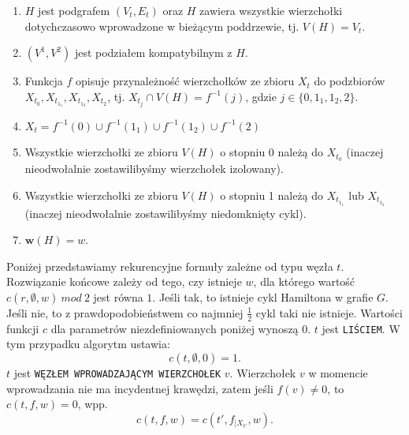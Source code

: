 \documentclass[12pt, oneside]{report}
\begin{document}
\begin{enumerate}[label=(\roman*)]
\item $H$ jest podgrafem $(V_t, E_t)$ oraz $H$ zawiera wszystkie wierzchołki dotychczasowo wprowadzone w bieżącym poddrzewie, tj. $V(H) = V_t$.
\item $(V^1, V^2)$ jest podziałem kompatybilnym z $H$.
\item Funkcja $f$ opisuje przynależność wierzchołków ze zbioru $X_t$ do podzbiorów $X_{t_0}, X_{t_{1_1}}, X_{t_{1_2}}, X_{t_2}$, tj. $X_{t_j} \cap V(H) = f^{-1}(j)$, gdzie $j \in \{0,1_1,1_2,2\}$.
\item $X_t = f^{-1}(0) \cup f^{-1}(1_1) \cup f^{-1}(1_2) \cup f^{-1}(2)$
\item Wszystkie wierzchołki ze zbioru $V(H)$ o stopniu 0 należą do $X_{t_0}$ (inaczej nieodwołalnie zostawilibyśmy wierzchołek izolowany).
\item Wszystkie wierzchołki ze zbioru $V(H)$ o stopniu 1 należą do $X_{t_{1_1}}$ lub $X_{t_{1_2}}$ (inaczej nieodwołalnie zostawilibyśmy niedomknięty cykl).
\item $\mathbf{w}(H) = w$.
\end{enumerate}

Poniżej przedstawiamy rekurencyjne formuły zależne od typu węzła $t$. Rozwiązanie końcowe zależy od tego, czy istnieje $w$, dla którego wartość $c(r,\emptyset,w) \ mod \ 2$ jest równa $1$. Jeśli tak, to istnieje cykl Hamiltona w grafie $G$. Jeśli nie, to z prawdopodobieństwem co najmniej $\frac{1}{2}$ cykl taki nie istnieje. Wartości funkcji $c$ dla parametrów niezdefiniowanych poniżej wynoszą $0$.
\newline\newline
$t$ jest \texttt{LIŚCIEM}. W tym przypadku algorytm ustawia:
$$c(t,\emptyset,0) = 1.$$
\newline
$t$ jest \texttt{WĘZŁEM WPROWADZAJĄCYM WIERZCHOŁEK} $v$. Wierzchołek $v$ w momencie wprowadzania nie ma incydentnej krawędzi, zatem jeśli $f(v) \neq 0$, to $c(t,f,w) = 0$, wpp.
$$c(t,f,w) = c(t',f_{\big|X_{t'}},w).$$
\end{document}
